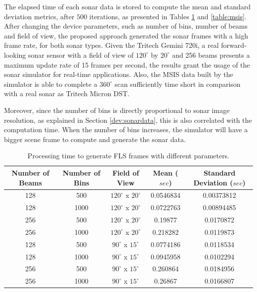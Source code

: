 \documentclass[final,5p,times]{elsarticle}
\begin{document}
The elapsed time of each sonar data is stored to compute the mean and standard deviation metrics, after $500$ iterations, as presented in Tables \ref{table:fls} and \ref{table:msis}. After changing the device parameters, such as number of bins, number of beams and field of view, the proposed approach generated the sonar frames with a high frame rate, for both sonar types. Given the Tritech Gemini 720i, a real forward-looking sonar sensor with a field of view of $120^{\circ}$ by $20^{\circ}$ and 256 beams presents a maximum update rate of 15 frames per second, the results grant the usage of the sonar simulator for real-time applications. Also, the MSIS data built by the simulator is able to complete a $360^{\circ}$ scan sufficiently time short in comparison with a real sonar as Tritech Micron DST.

Moreover, since the number of bins is directly proportional to sonar image resolution, as explained in Section \ref{dev:sonardata}, this is also correlated with the computation time. When the number of bins increases, the simulator will have a bigger scene frame to compute and generate the sonar data.

\begin{table}[!h]
    \caption{Processing time to generate FLS frames with different parameters.}
    \label{table:fls}
    \begin{center}
        \begin{tabular}{| c | c | c | c | c |}
            \hline
            Number of Beams & Number of Bins & Field of View & Mean ($sec$) & Standard Deviation ($sec$) \\
            \hline
            128     & 500       & $120^{\circ}$ x $20^{\circ}$        & 0.0546834   & 0.00373812  \\ \hline
            128     & 1000      & $120^{\circ}$ x $20^{\circ}$        & 0.0722763	& 0.00894485  \\ \hline
            256     & 500       & $120^{\circ}$ x $20^{\circ}$        & 0.19877	    & 0.0170872   \\ \hline
            256     & 1000      & $120^{\circ}$ x $20^{\circ}$        & 0.218282	& 0.0119873   \\ \hline
            128     & 500       & $90^{\circ}$ x $15^{\circ}$         & 0.0774186	& 0.0118534   \\ \hline
            128     & 1000      & $90^{\circ}$ x $15^{\circ}$         & 0.0945958	& 0.0102294   \\ \hline
            256     & 500       & $90^{\circ}$ x $15^{\circ}$         & 0.260864	& 0.0184956   \\ \hline
            256     & 1000      & $90^{\circ}$ x $15^{\circ}$         & 0.26867	    & 0.0166807   \\ \hline
        \end{tabular}
    \end{center}
\end{table}
\end{document}
